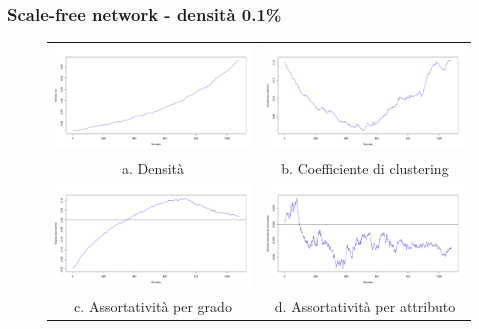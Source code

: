 \documentclass[a4paper,12pt]{article}
\begin{document}
\subsubsection{Scale-free network - densità 0.1\%}
\begin{figure}[h]
\begin{tabular}{cc}
  \includegraphics[width=81mm]{images/evolution_1000_sf_1080_0.pdf} &   \includegraphics[width=81mm]{images/clustering_1000_sf_1080_0.pdf} \\
a. Densità & b. Coefficiente di clustering \\[6pt]
 \includegraphics[width=81mm]{images/deg_assortativity_1000_sf_1080_0.pdf} &   \includegraphics[width=81mm]{images/homophily_1000_sf_1080_0.pdf} \\
c. Assortatività per grado & d. Assortatività per attributo \\[6pt]
\end{tabular}
\end{figure}
\newpage
\end{document}
